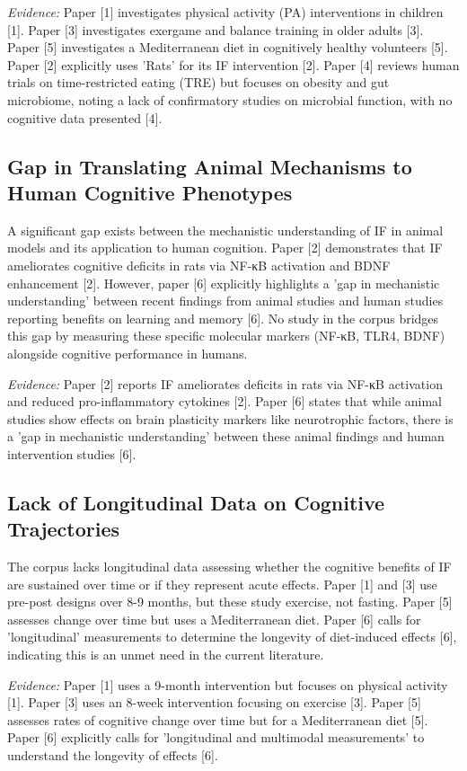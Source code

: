 \documentclass[11pt]{article}
\begin{document}
\textit{Evidence:} Paper [1] investigates physical activity (PA) interventions in children [1]. Paper [3] investigates exergame and balance training in older adults [3]. Paper [5] investigates a Mediterranean diet in cognitively healthy volunteers [5]. Paper [2] explicitly uses 'Rats' for its IF intervention [2]. Paper [4] reviews human trials on time-restricted eating (TRE) but focuses on obesity and gut microbiome, noting a lack of confirmatory studies on microbial function, with no cognitive data presented [4].

\subsection{Gap in Translating Animal Mechanisms to Human Cognitive Phenotypes}
A significant gap exists between the mechanistic understanding of IF in animal models and its application to human cognition. Paper [2] demonstrates that IF ameliorates cognitive deficits in rats via NF-κB activation and BDNF enhancement [2]. However, paper [6] explicitly highlights a 'gap in mechanistic understanding' between recent findings from animal studies and human studies reporting benefits on learning and memory [6]. No study in the corpus bridges this gap by measuring these specific molecular markers (NF-κB, TLR4, BDNF) alongside cognitive performance in humans.

\textit{Evidence:} Paper [2] reports IF ameliorates deficits in rats via NF-κB activation and reduced pro-inflammatory cytokines [2]. Paper [6] states that while animal studies show effects on brain plasticity markers like neurotrophic factors, there is a 'gap in mechanistic understanding' between these animal findings and human intervention studies [6].

\subsection{Lack of Longitudinal Data on Cognitive Trajectories}
The corpus lacks longitudinal data assessing whether the cognitive benefits of IF are sustained over time or if they represent acute effects. Paper [1] and [3] use pre-post designs over 8-9 months, but these study exercise, not fasting. Paper [5] assesses change over time but uses a Mediterranean diet. Paper [6] calls for 'longitudinal' measurements to determine the longevity of diet-induced effects [6], indicating this is an unmet need in the current literature.

\textit{Evidence:} Paper [1] uses a 9-month intervention but focuses on physical activity [1]. Paper [3] uses an 8-week intervention focusing on exercise [3]. Paper [5] assesses rates of cognitive change over time but for a Mediterranean diet [5]. Paper [6] explicitly calls for 'longitudinal and multimodal measurements' to understand the longevity of effects [6].
\end{document}
